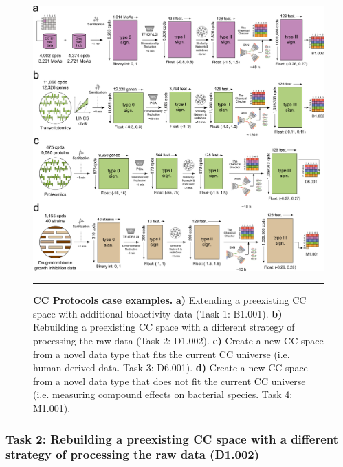 \begin{figure}[t!]
  \centering
  \includegraphics[width=\linewidth]{figures/Protocols/Main/Pipeline_v4.png}
  \caption{
    \textbf{CC Protocols case examples.} 
    \textbf{a)} Extending a preexisting CC space with additional bioactivity data (Task 1: B1.001).
    \textbf{b)} Rebuilding a preexisting CC space with a different strategy of processing the raw data (Task 2: D1.002).
    \textbf{c)} Create a new CC space from a novel data type that fits the current CC universe (i.e. human-derived data. Task 3: D6.001). 
    \textbf{d)} Create a new CC space from a novel data type that does not fit the current CC universe (i.e. measuring compound effects on bacterial species. Task 4: M1.001).
  }
  \rule[0ex]{\textwidth}{0.5pt}
  \vspace{-5mm}
  \label{Protocols_Fig2}
\end{figure}





\subsubsection{Task 2: Rebuilding a preexisting CC space with a different strategy of processing the raw data (D1.002)}


